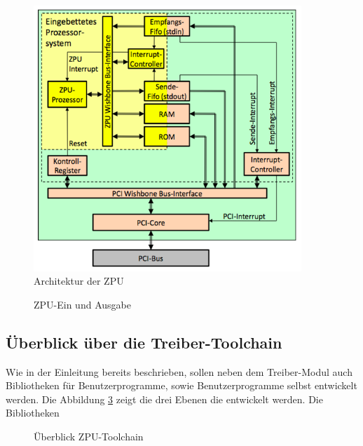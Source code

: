 \documentclass[11pt]{scrartcl}
\begin{document}
\begin{figure}[H]
	\begin{center}
		\includegraphics[width=0.9\textwidth]{images/zpu_architecture}
		\caption{Architektur der ZPU}
		\label{zpu_architecture}	
	\end{center}
\end{figure}


\begin{figure}[H]
	\begin{center}
		
		\caption{ZPU-Ein und Ausgabe}
		\label{zpu_io}
	\end{center}
\end{figure}

\subsection{Überblick über die Treiber-Toolchain}
Wie in der Einleitung bereits beschrieben, sollen neben dem Treiber-Modul auch Bibliotheken für Benutzerprogramme, sowie Benutzerprogramme selbst entwickelt werden. Die Abbildung \ref{zpu_overview} zeigt die drei Ebenen die entwickelt werden. Die Bibliotheken 

\begin{figure}[!htb]
	\begin{center}
		
		\caption{Überblick ZPU-Toolchain}
		\label{zpu_overview}	
	\end{center}
\end{figure}
\end{document}
